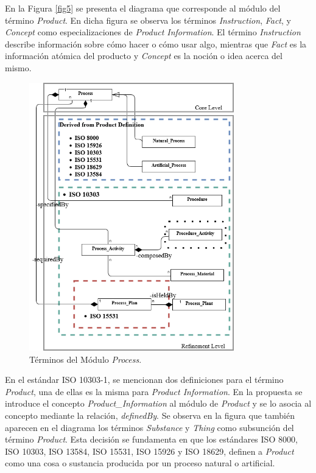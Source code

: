 \documentclass[journal]{IEEEtran}
\begin{document}
En la Figura \ref{fig5} se presenta el diagrama que corresponde al m\'odulo del t\'ermino \emph{Product}. En dicha figura se observa los t\'erminos \emph{Instruction}, \emph{Fact}, y \emph{Concept} como especializaciones de \emph{Product Information}. El t\'ermino \emph{Instruction} describe informaci\'on sobre c\'omo hacer o c\'omo usar algo, mientras que \emph{Fact} es la informaci\'on at\'omica del producto y \emph{Concept} es la noci\'on o idea acerca del mismo.

\begin{figure}[!t]
\centering
\includegraphics[width=3.5in]{figures/Completo-Process.png}
\caption{T\'erminos del M\'odulo \emph{Process}.}
\label{fig4}
\end{figure}

En el est\'andar ISO 10303-1, se mencionan dos definiciones para el t\'ermino \emph{Product}, una de ellas es la misma para \emph{Product Information}. En la propuesta se introduce el concepto \emph{Product\_Information} al m\'odulo de \emph{Product} y se lo asocia al concepto mediante la relaci\'on, \emph{definedBy}. Se observa en la figura que tambi\'en aparecen en el diagrama los t\'erminos \emph{Substance} y \emph{Thing} como subsunci\'on del t\'ermino \emph{Product}. Esta decisi\'on se fundamenta en que los est\'andares ISO 8000, ISO 10303, ISO 13584, ISO 15531, ISO 15926 y ISO 18629, definen a \emph{Product} como una cosa o sustancia producida por un proceso natural o artificial.
\end{document}
